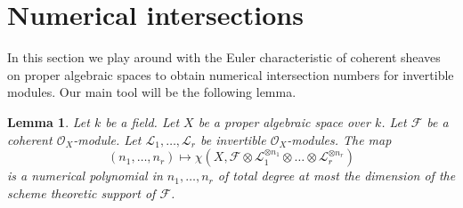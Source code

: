 \documentclass{stacks-project}
\theoremstyle{plain}
\newtheorem{lemma}[subsection]{Lemma}
\theoremstyle{definition}
\theoremstyle{remark}
\numberwithin{equation}{subsection}
\begin{document}
\section{Numerical intersections}
\label{section-num}

\noindent
In this section we play around with the Euler characteristic of
coherent sheaves on proper algebraic spaces to obtain numerical intersection
numbers for invertible modules. Our main tool will be the following
lemma.

\begin{lemma}
\label{lemma-numerical-polynomial-from-euler}
Let $k$ be a field. Let $X$ be a proper algebraic space over $k$.
Let $\mathcal{F}$ be a coherent $\mathcal{O}_X$-module. Let
$\mathcal{L}_1, \ldots, \mathcal{L}_r$ be invertible $\mathcal{O}_X$-modules.
The map
$$
(n_1, \ldots, n_r) \longmapsto
\chi(X, \mathcal{F} \otimes
\mathcal{L}_1^{\otimes n_1} \otimes \ldots \otimes
\mathcal{L}_r^{\otimes n_r})
$$
is a numerical polynomial in $n_1, \ldots, n_r$ of total degree at
most the dimension of the scheme theoretic support of $\mathcal{F}$.
\end{lemma}
\end{document}
